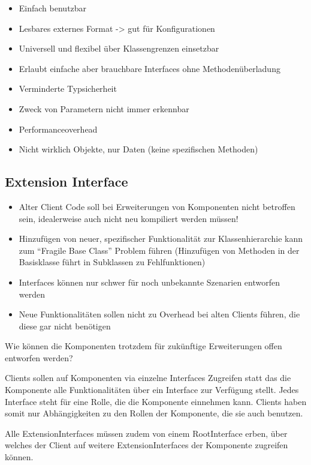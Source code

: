 \begin{itemize}
	\item Einfach benutzbar
	\item Lesbares externes Format -> gut für Konfigurationen
	\item Universell und flexibel über Klassengrenzen einsetzbar
	\item Erlaubt einfache aber brauchbare Interfaces ohne Methodenüberladung
	\item Verminderte Typsicherheit
	\item Zweck von Parametern nicht immer erkennbar
	\item Performanceoverhead
	\item Nicht wirklich Objekte, nur Daten (keine spezifischen Methoden)
\end{itemize}

\subsection{Extension Interface}

\begin{itemize}
	\item Alter Client Code soll bei Erweiterungen von Komponenten nicht betroffen sein, idealerweise auch nicht neu kompiliert werden müssen!
	\item Hinzufügen von neuer, spezifischer Funktionalität zur Klassenhierarchie kann zum ``Fragile Base Class'' Problem führen (Hinzufügen von Methoden in der Basisklasse führt in Subklassen zu Fehlfunktionen)
	\item Interfaces können nur schwer für noch unbekannte Szenarien entworfen werden
	\item Neue Funktionalitäten sollen nicht zu Overhead bei alten Clients führen, die diese gar nicht benötigen
\end{itemize}

Wie können die Komponenten trotzdem für zukünftige Erweiterungen offen entworfen werden?

Clients sollen auf Komponenten via einzelne Interfaces Zugreifen statt das die Komponente alle Funktionalitäten über ein Interface zur Verfügung stellt. Jedes Interface steht für eine Rolle, die die Komponente einnehmen kann. Clients haben somit nur Abhängigkeiten zu den Rollen der Komponente, die sie auch benutzen.

Alle ExtensionInterfaces müssen zudem von einem RootInterface erben, über welches der Client auf weitere ExtensionInterfaces der Komponente zugreifen können.

